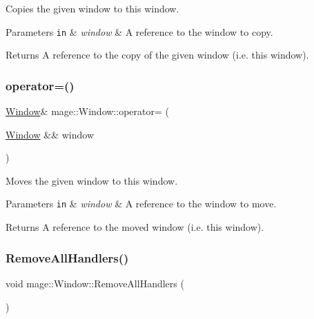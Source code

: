 Copies the given window to this window.


\begin{DoxyParams}[1]{Parameters}
\mbox{\tt in}  & {\em window} & A reference to the window to copy. \\
\hline
\end{DoxyParams}
\begin{DoxyReturn}{Returns}
A reference to the copy of the given window (i.\+e. this window). 
\end{DoxyReturn}
\hypertarget{classmage_1_1_window_aa52284540a75c98a2aa768a5d6410378}{}\label{classmage_1_1_window_aa52284540a75c98a2aa768a5d6410378} 
\subsubsection{\texorpdfstring{operator=()}{operator=()}\hspace{0.1cm}{\footnotesize\ttfamily [2/2]}}
{\footnotesize\ttfamily \hyperlink{classmage_1_1_window}{Window}\& mage\+::\+Window\+::operator= (\begin{DoxyParamCaption}\item[{\hyperlink{classmage_1_1_window}{Window} \&\&}]{window }\end{DoxyParamCaption})\hspace{0.3cm}{\ttfamily [delete]}}

Moves the given window to this window.


\begin{DoxyParams}[1]{Parameters}
\mbox{\tt in}  & {\em window} & A reference to the window to move. \\
\hline
\end{DoxyParams}
\begin{DoxyReturn}{Returns}
A reference to the moved window (i.\+e. this window). 
\end{DoxyReturn}
\hypertarget{classmage_1_1_window_a9b1efac3d0bd27df4e33ab704bc59f98}{}\label{classmage_1_1_window_a9b1efac3d0bd27df4e33ab704bc59f98} 
\subsubsection{\texorpdfstring{Remove\+All\+Handlers()}{RemoveAllHandlers()}}
{\footnotesize\ttfamily void mage\+::\+Window\+::\+Remove\+All\+Handlers (\begin{DoxyParamCaption}{ }\end{DoxyParamCaption})\hspace{0.3cm}{\ttfamily [noexcept]}}

